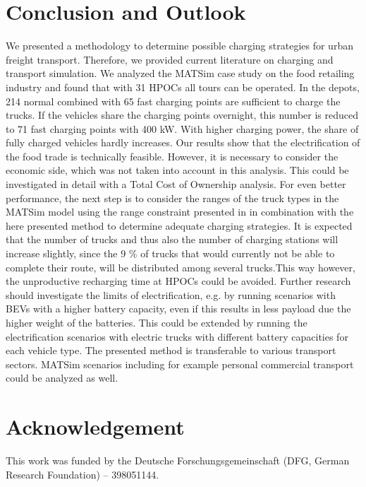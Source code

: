 \documentclass[3p,times,procedia]{elsarticle}
\begin{document}
\section{Conclusion and Outlook}
\label{conclusion}
We presented a methodology to determine possible charging strategies for urban freight transport. Therefore, we provided current literature on charging and transport simulation. We analyzed the MATSim case study on the food retailing industry and found that with 31 HPOCs all tours can be operated. In the depots, 214 normal combined with 65 fast charging points are sufficient to charge the trucks. If the vehicles share the charging points overnight, this number is reduced to 71 fast charging points with 400 kW. With higher charging power, the share of fully charged vehicles hardly increases.
Our results show that the electrification of the food trade is technically feasible. However, it is necessary to consider the economic side, which was not taken into account in this analysis. This could be investigated in detail with a Total Cost of Ownership analysis. For even better performance, the next step is to consider the ranges of the truck types in the MATSim model using the range constraint presented in \cite{EwertEtAl2020_VRPDistanceConstraint_accepted} in combination with the here presented method to determine adequate charging strategies. It is expected that the number of trucks and thus also the number of charging stations will increase slightly, since the 9 \% of trucks that would currently not be able to complete their route, will be distributed among several trucks.This way however, the unproductive recharging time at HPOCs could be avoided. Further research should investigate the limits of electrification, e.g. by running scenarios with BEVs with a higher battery capacity, even if this results in less payload due the higher weight of the batteries. This could be extended by running the electrification scenarios with electric trucks with different battery capacities for each vehicle type. The presented method is transferable to various transport sectors. MATSim scenarios including for example personal commercial transport could be analyzed as well.





\section*{Acknowledgement}
This work was funded by the Deutsche Forschungsgemeinschaft (DFG, German Research Foundation) -- 398051144.
\end{document}
